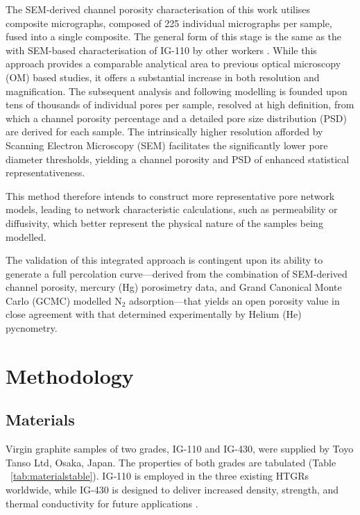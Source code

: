 \documentclass[review]{elsarticle}
\begin{document}
The SEM-derived channel porosity characterisation of this work utilises
composite micrographs, composed of 225 individual micrographs per sample, fused
into a single composite. The general form of this stage is the same as the with
SEM-based characterisation of IG-110 by other workers
\citep{huang2021statistical}. While this approach provides a comparable
analytical area to previous optical microscopy (OM) based studies, it offers a
substantial increase in both resolution and magnification. The subsequent
analysis and following modelling is founded upon tens of thousands of individual
pores per sample, resolved at high definition, from which a channel porosity
percentage and a detailed pore size distribution (PSD) are derived for each
sample. The intrinsically higher resolution afforded by Scanning Electron
Microscopy (SEM) facilitates the significantly lower pore diameter thresholds,
yielding a channel porosity and PSD of enhanced statistical representativeness.

This method therefore intends to construct more representative pore network
models, leading to network characteristic calculations, such as permeability or
diffusivity,  which better represent the physical nature of the samples being
modelled.

The validation of this integrated approach is contingent upon its ability to
generate a full percolation curve—derived from the combination of SEM-derived
channel porosity, mercury (Hg) porosimetry data, and Grand Canonical Monte Carlo
(GCMC) modelled N$_2$ adsorption—that yields an open porosity value in close
agreement with that determined experimentally by Helium (He) pycnometry.


\section{Methodology}

\subsection{Materials}

Virgin graphite samples of two grades, IG-110 and IG-430, were supplied by Toyo
Tanso Ltd\texttrademark{}, Osaka, Japan. The properties of both grades are
tabulated (Table ~\ref{tab:materialstable}). IG‑110 is employed in the
three existing HTGRs worldwide, while IG‑430 is designed to deliver increased
density, strength, and thermal conductivity for future
applications \citep{toyotanso_atomic_nuclear}.
\end{document}
